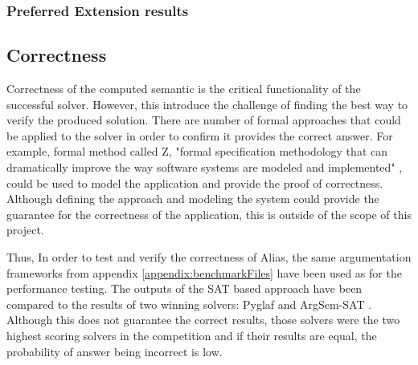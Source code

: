 \subsubsection{Preferred Extension results}

\subsection{Correctness}
Correctness of the computed semantic is the critical functionality of the successful solver. However, this introduce the challenge of finding the best way to verify the produced solution. There are number of formal approaches that could be applied to the solver in order to confirm it provides the correct answer. For example, formal method called Z, "formal specification methodology that can dramatically improve the way software systems are modeled and implemented" \citep{potter1996introduction}, could be used to model the application and provide the proof of correctness. Although defining the approach and modeling the system could provide the guarantee for the correctness of the application, this is outside of the scope of this project. 

Thus, In order to test and verify the correctness of Alias, the same argumentation frameworks from appendix \ref{appendix:benchmarkFiles} have been used as for the performance testing. The outputs of the SAT based approach have been compared to the results of two winning solvers: Pyglaf \citep{pyglaf} and ArgSem-SAT \citep{argsemsat}. Although this does not guarantee the correct results, those solvers were the two highest scoring solvers in the competition and if their results are equal, the probability of answer being incorrect is low.
